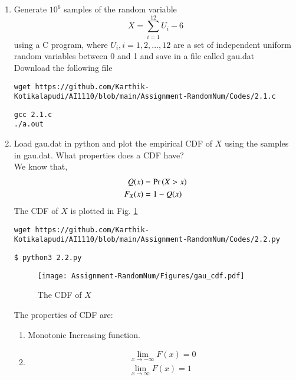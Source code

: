 \documentclass[journal,12pt,twocolumn]{IEEEtran}
\renewcommand\thesection{\arabic{section}}
\begin{document}
\begin{enumerate}[label=\thesection.\arabic*
,ref=\thesection.\theenumi]
%
\item
Generate $10^6$ samples of the random variable
%
\begin{equation}
X = \sum_{i=1}^{12}U_i -6
\end{equation}
%
using a C program, where $U_i, i = 1,2,\dots, 12$ are  a set of independent uniform random variables between 0 and 1
and save in a file called gau.dat\\
\solution 
Download the following file
\begin{lstlisting}
wget https://github.com/Karthik-Kotikalapudi/AI1110/blob/main/Assignment-RandomNum/Codes/2.1.c
\end{lstlisting}
\begin{lstlisting}
gcc 2.1.c
./a.out
\end{lstlisting}

\item Load gau.dat in python and plot the empirical CDF of $X$ using the samples in gau.dat. What properties does a CDF have?
\\
\solution 
We know that,
\begin{align}
Q(x) &= \Pr\left(X>x\right)
\\
F_X(x) &= 1 - Q(x)
\end{align}
The CDF of $X$ is plotted in Fig. \ref{fig:gauss_cdf}
\begin{lstlisting}
wget https://github.com/Karthik-Kotikalapudi/AI1110/blob/main/Assignment-RandomNum/Codes/2.2.py
\end{lstlisting}
\begin{lstlisting}
$ python3 2.2.py
\end{lstlisting}
\begin{figure}[ht!]
\centering
\texttt{[image: Assignment-RandomNum/Figures/gau\_cdf.pdf]}
\caption{The CDF of $X$}
\label{fig:gauss_cdf}
\end{figure}
The properties of CDF are:
\begin{enumerate}
\item Monotonic Increasing function.
\item
\begin{align}
\lim_{x \to -\infty} F(x) = 0\\
\lim_{x \to \infty} F(x) = 1
\end{align}
\end{enumerate}


\end{enumerate}
\end{document}
